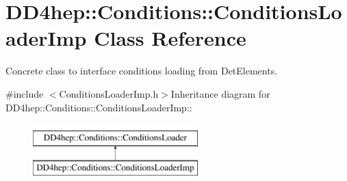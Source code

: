 \hypertarget{class_d_d4hep_1_1_conditions_1_1_conditions_loader_imp}{
\section{DD4hep::Conditions::ConditionsLoaderImp Class Reference}
\label{class_d_d4hep_1_1_conditions_1_1_conditions_loader_imp}
}


Concrete class to interface conditions loading from DetElements.  


{\ttfamily \#include $<$ConditionsLoaderImp.h$>$}Inheritance diagram for DD4hep::Conditions::ConditionsLoaderImp::\begin{figure}[H]
\begin{center}
\leavevmode
\includegraphics[height=2cm]{class_d_d4hep_1_1_conditions_1_1_conditions_loader_imp}
\end{center}
\end{figure}
